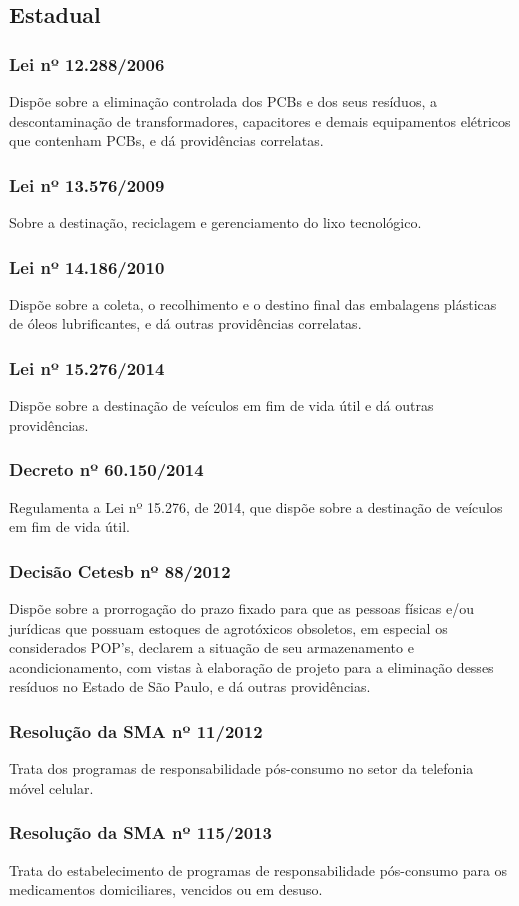 \begin{subapend}
	\subsection{Estadual}
	\begin{subsubapend}
		\item \subsubsection{Lei nº 12.288/2006}
		Dispõe sobre a eliminação controlada dos PCBs e dos seus resíduos, a descontaminação de transformadores, capacitores e demais equipamentos elétricos que contenham PCBs, e dá providências correlatas.
		\subsubsection{Lei nº 13.576/2009}
		Sobre a destinação, reciclagem e gerenciamento do lixo tecnológico.
		\subsubsection{Lei nº 14.186/2010}
		Dispõe sobre a coleta, o recolhimento e o destino final das embalagens plásticas de óleos lubrificantes, e dá outras providências correlatas.
		\subsubsection{Lei nº 15.276/2014}
		Dispõe sobre a destinação de veículos em fim de vida útil e dá outras providências.
		\subsubsection{Decreto nº 60.150/2014}
		Regulamenta a Lei nº 15.276, de 2014, que dispõe sobre a destinação de veículos em fim de vida útil.
		\subsubsection{Decisão Cetesb nº 88/2012}
		Dispõe sobre a prorrogação do prazo fixado para que as pessoas físicas e/ou jurídicas que possuam estoques de agrotóxicos obsoletos, em especial os considerados POP's, declarem a situação de seu armazenamento e acondicionamento, com vistas à elaboração de projeto para a eliminação desses resíduos no Estado de São Paulo, e dá outras providências.
		\subsubsection{Resolução da SMA nº 11/2012}
		Trata dos programas de responsabilidade pós-consumo no setor da telefonia móvel celular.
		\subsubsection{Resolução da SMA nº 115/2013}
		Trata do estabelecimento de programas de responsabilidade pós-consumo para os medicamentos domiciliares, vencidos ou em desuso.
	\end{subsubapend}
\end{subapend}	


